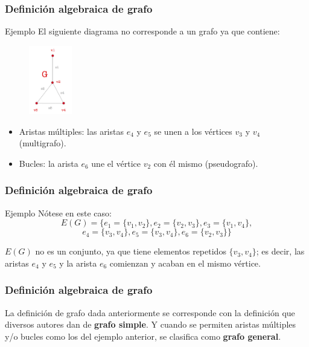 \documentclass{beamer}
\begin{document}
\begin{frame}
\frametitle{Definici\'on algebraica de grafo}

\begin{block}{Ejemplo}
El siguiente diagrama no corresponde a un grafo ya que contiene:
\begin{figure}[h]
 \label{fig:volumen}
\centering
\includegraphics[height=3cm]{g3}
\end{figure}
\begin{itemize}
\item Aristas m\'ultiples: las aristas $e_4$ y $e_5$ se unen a los v\'ertices $v_3$ y $v_4$ (multigrafo).
\item Bucles: la arista $e_6$ une el v\'ertice $v_2$ con \'el mismo (pseudografo). 
\end{itemize}
\end{block}
\end{frame}




\begin{frame}
\frametitle{Definici\'on algebraica de grafo}

\begin{block}{Ejemplo}
N\'otese en este caso: 
\[E(G) = \{e_1=\{v_1,v_2\}, e_2=\{v_2,v_3\}, e_3 = \{v_1,v_4\}, \]
\[e_4 = \{v_3,v_4\}, e_5 = \{v_3,v_4\}, e_6 = \{v_2,v_3\}\}\]

$E(G)$ no es un conjunto, ya que tiene elementos repetidos $\{v_3,v_4\}$; es decir, las aristas $e_4$ y $e_5$ y la arista $e_6$ comienzan y acaban en el mismo v\'ertice. 

\end{block}
\end{frame}



\begin{frame}
\frametitle{Definici\'on algebraica de grafo}
La definici\'on de grafo dada anteriormente se corresponde con la definici\'on que diversos autores dan de \textbf{grafo simple}.  Y cuando se permiten aristas m\'ultiples y/o bucles como los del ejemplo anterior, se clasifica como \textbf{grafo general}. 
\end{frame}
\end{document}
